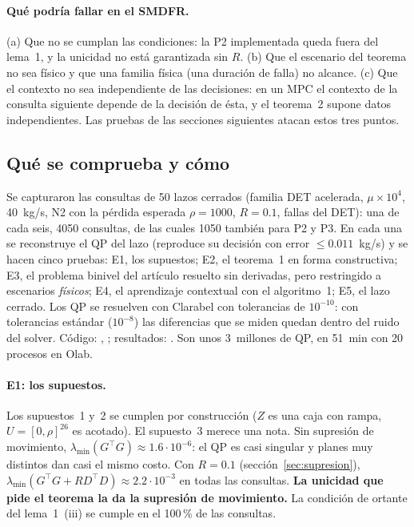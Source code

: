 \paragraph{Qué podría fallar en el SMDFR.} (a) Que no se cumplan las condiciones: la P2
implementada queda fuera del lema~1, y la unicidad no está garantizada sin $R$. (b) Que el
escenario del teorema no sea físico y que una familia física (una duración de falla) no alcance.
(c) Que el contexto no sea independiente de las decisiones: en un MPC el contexto de la consulta
siguiente depende de la decisión de ésta, y el teorema~2 supone datos independientes. Las pruebas
de las secciones siguientes atacan estos tres puntos.

\subsection{Qué se comprueba y cómo}\label{sec:rozas-que}
Se capturaron las consultas de 50 lazos cerrados (familia DET acelerada, $\mu\times10^4$,
40~kg/s, N2 con la pérdida esperada $\rho=1000$, $R=0.1$, fallas del DET): una de cada seis,
4050 consultas, de las cuales 1050 también para P2 y P3. En cada una se reconstruye el QP del
lazo (reproduce su decisión con error $\le0.011$~kg/s) y se hacen cinco pruebas: E1, los
supuestos; E2, el teorema~1 en forma constructiva; E3, el problema binivel del artículo resuelto
sin derivadas, pero restringido a escenarios \emph{físicos}; E4, el aprendizaje contextual con el
algoritmo~1; E5, el lazo cerrado. Los QP se resuelven con Clarabel con tolerancias de $10^{-10}$:
con tolerancias estándar ($10^{-8}$) las diferencias que se miden quedan dentro del ruido del
solver. Código: , ; resultados:
. Son unos 3~millones de QP, en 51~min con 20 procesos en
Olab.

\paragraph{E1: los supuestos.} Los supuestos~1 y~2 se cumplen por construcción ($Z$ es una caja
con rampa, $U=[0,\rho]^{26}$ es acotado). El supuesto~3 merece una nota. Sin supresión de
movimiento, $\lambda_{\min}(G^\top G)\approx1.6\cdot10^{-6}$: el QP es casi singular y planes muy
distintos dan casi el mismo costo. Con $R=0.1$ (sección~\ref{sec:supresion}),
$\lambda_{\min}(G^\top G+RD^\top D)\approx2.2\cdot10^{-3}$ en todas las consultas. \textbf{La
unicidad que pide el teorema la da la supresión de movimiento.} La condición de ortante del
lema~1~(iii) se cumple en el 100\,\% de las consultas.

